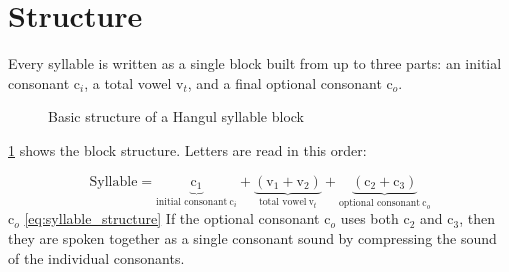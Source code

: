 \section{Structure}
    Every syllable is written as a single block built from up to three parts: an initial consonant $\mathrm{c}_i$, a total vowel $\mathrm{v}_t$, and a final optional consonant $\mathrm{c}_o$.
    
    \begin{figure}[H]
        \centering
        \caption{Basic structure of a Hangul syllable block}
        \label{fig:block}
    \end{figure}

    \cref{fig:block} shows the block structure. Letters are read in this order:

    \begin{equation}
        \mathrm{Syllable} = 
        \underbrace{\mathrm{c}_1}_{\text{initial consonant}\ \mathrm{c}_i} + \underbrace{(\mathrm{v}_1 + \mathrm{v}_2)}_{\text{total vowel}\ \mathrm{v}_t} + \underbrace{(\mathrm{c}_2 + \mathrm{c}_3)}_{\text{optional consonant}\ \mathrm{c}_o}  \label{eq:syllable_structure}
    \end{equation}
    $\mathrm{c}_o$ \cref{eq:syllable_structure} If the optional consonant $\mathrm{c}_o$ uses both $\mathrm{c}_2$ and $\mathrm{c}_3$, then they are spoken together as a single consonant sound by compressing the sound of the individual consonants.